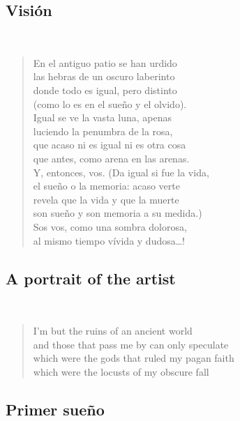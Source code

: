 \documentclass[a4paper, 12pt]{article}
\begin{document}
\pagebreak
\subsection{Visión}
~ 

\begin{verse}
    
En el antiguo patio se han urdido\\
las hebras de un oscuro laberinto\\
donde todo es igual, pero distinto\\
(como lo es en el sueño y el olvido).\\
Igual se ve la vasta luna, apenas\\
luciendo la penumbra de la rosa,\\
que acaso ni es igual ni es otra cosa\\
que antes, como arena en las arenas.\\
Y, entonces, vos. (Da igual si fue la vida,\\
el sueño o la memoria: acaso verte\\
revela que la vida y que la muerte\\
son sueño y son memoria a su medida.)\\
Sos vos, como una sombra dolorosa,\\
al mismo tiempo vívida y dudosa…!\\
\end{verse}

\pagebreak
\subsection{A portrait of the artist}
~ 

\begin{verse}
I'm but the ruins of an ancient world\\
and those that pass me by can only speculate\\
which were the gods that ruled my pagan faith\\
which were the locusts of my obscure fall\\
\end{verse}

\pagebreak 
\subsection{Primer sueño}
~ 
\end{document}
